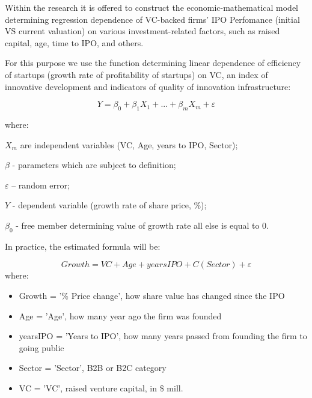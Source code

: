Within the research it is offered to construct the economic-mathematical model determining regression dependence of VC-backed firms' IPO Perfomance (initial VS current valuation) on various investment-related factors, such as raised capital, age, time to IPO, and others.

For this purpose we use the function determining linear dependence of efficiency of startups (growth rate of profitability of startups) on VC, an index of innovative development and indicators of quality of innovation infrastructure:

\begin{equation} \label{eq:OLS}
Y = \beta_0 + \beta_{1}X_{1}+...+\beta_{m}X_{m} + \varepsilon
\end{equation}

where:

$X_m$ are independent variables (VC, Age, years to IPO, Sector);

$\beta$ - parameters which are subject to definition; 

$\varepsilon$ – random error;

$Y$ - dependent variable (growth rate of share price, \%);


$\beta_0$ - free member determining value of growth rate all else is equal to 0.

In practice, the estimated formula will be:

\begin{equation} \label{eq:OLS_hat}
    Growth = VC + Age + yearsIPO + C(Sector) + \varepsilon
\end{equation}
where:
\begin{itemize}
    \item Growth = '\% Price change', how share value has changed since the IPO
    \item Age = 'Age', how many year ago the firm was founded
    \item yearsIPO = 'Years to IPO', how many years passed from founding the firm to going public
    \item Sector = 'Sector', B2B or B2C category
    \item VC = 'VC', raised venture capital, in \$ mill.
\end{itemize}